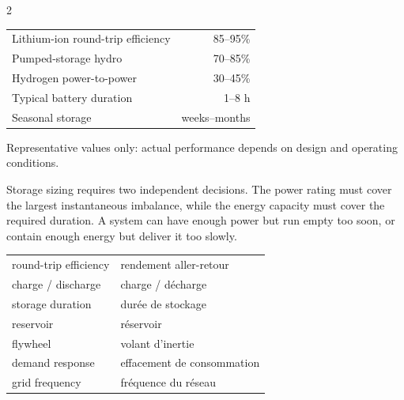 \begin{multicols}{2}
\begin{keyfigures}
\begin{tabularx}{\linewidth}{@{}Xr@{}}
Lithium-ion round-trip efficiency & 85--95\%\\
Pumped-storage hydro & 70--85\%\\
Hydrogen power-to-power & 30--45\%\\
Typical battery duration & 1--8 h\\
Seasonal storage & weeks--months
\end{tabularx}
\end{keyfigures}

\begin{tcolorbox}[title=\sffamily\bfseries Storage technologies compared,colback=white,colframe=ECBlue]
\centering
{}
{\scriptsize Representative values only: actual performance depends on design and operating conditions.}
\end{tcolorbox}

\begin{tcolorbox}[title=\sffamily\bfseries Engineering Insight,colback=white,colframe=ECOrange]
Storage sizing requires two independent decisions. The power rating must cover the largest instantaneous imbalance, while the energy capacity must cover the required duration. A system can have enough power but run empty too soon, or contain enough energy but deliver it too slowly.
\end{tcolorbox}

\begin{vocabulary}
\begin{tabularx}{\linewidth}{@{}lX@{}}
round-trip efficiency & rendement aller-retour\\
charge / discharge & charge / décharge\\
storage duration & durée de stockage\\
reservoir & réservoir\\
flywheel & volant d'inertie\\
demand response & effacement de consommation\\
grid frequency & fréquence du réseau
\end{tabularx}
\end{vocabulary}


\end{multicols}
